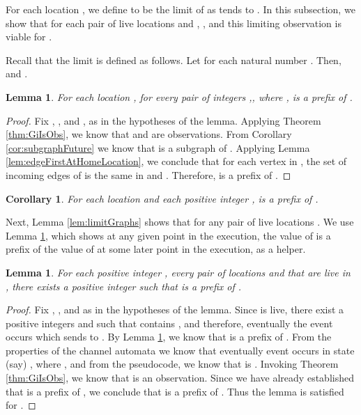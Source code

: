 \documentclass[11pt]{article}
\numberwithin{theorem}{section}
\newtheorem{lemma}[theorem]{Lemma}
\newtheorem{corollary}[theorem]{Corollary}
\begin{document}
For each location , we define  to be the limit of  as  tends to . In this subsection, we show that
for each pair of live locations  and , , and this limiting observation is viable for .

Recall that the limit  is defined as follows. Let  for each natural number . Then,  and .



\begin{lemma}
\label{lem:prefixOfFutureObs}
For each location , for every pair of integers ,, where
,   is a prefix of .
\end{lemma} 

\begin{proof}
Fix , , and , as in the hypotheses of the lemma. Applying Theorem
\ref{thm:GiIsObs}, we know that  and  are
observations.
From Corollary \ref{cor:subgraphFuture} we know that  is a
subgraph of . Applying Lemma
\ref{lem:edgeFirstAtHomeLocation}, we conclude that for each vertex in
, the set of incoming edges of  is the same in
 and . Therefore, 
is a prefix of .
\end{proof}







\begin{corollary}\label{cor:ObsPrefixOfLimit}
For each location  and each positive integer , 
is a prefix of .
\end{corollary}

Next, Lemma \ref{lem:limitGraphs} shows that for any pair  of live locations . We use Lemma \ref{lem:subgraphFutureLiveLocation}, which shows at any given point in the execution, the value of  is a prefix of the value of  at some later point in the execution, as a helper.



\begin{lemma}\label{lem:subgraphFutureLiveLocation}
For each positive integer , every pair of locations  and 
that are live in , there exists a positive integer  such that
 is a prefix of .
\end{lemma}

\begin{proof}
Fix , , and  as in the hypotheses of the lemma.
Since  is live, there exist a positive integers  and
 such that  contains
, and therefore, eventually the event
 occurs which sends 
to . By Lemma \ref{lem:prefixOfFutureObs},
we know that
 is a prefix of . From the
properties of the channel automata we know that eventually event
 occurs in state (say)
, where , and from the pseudocode, we know
that  is . Invoking Theorem \ref{thm:GiIsObs}, we know that  is an observation. 
Since we have already established that  is a prefix
of , we conclude that  is a
prefix of . Thus the lemma is satisfied for
.
\end{proof}
\end{document}
